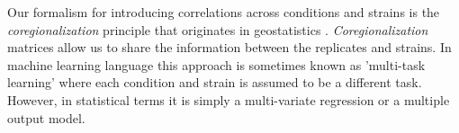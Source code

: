 

Our formalism for introducing correlations across conditions and strains is the \emph{coregionalization} principle \cite{Alvarez:2011} that originates in geostatistics \cite{Wackernagel:2003}. \emph{Coregionalization} matrices allow us to share the information 
between the replicates and strains. In machine learning language this approach is sometimes known as 'multi-task learning' where each condition and strain is assumed to be a different task. However, in statistical terms it is simply a multi-variate regression or a multiple output model.

